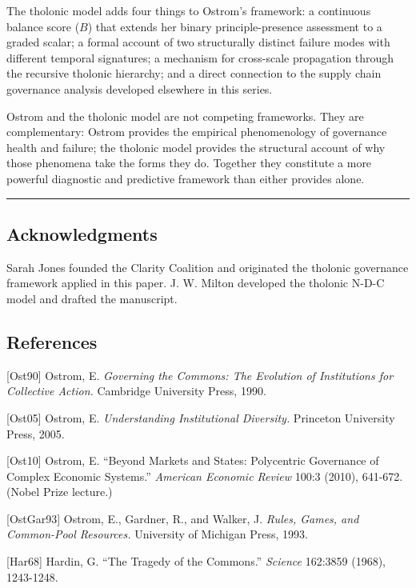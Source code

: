 \documentclass[
  11pt,
  letterpaper,
]{article}
\begin{document}
The tholonic model adds four things to Ostrom's framework: a continuous
balance score (\(B\)) that extends her binary principle-presence
assessment to a graded scalar; a formal account of two structurally
distinct failure modes with different temporal signatures; a mechanism
for cross-scale propagation through the recursive tholonic hierarchy;
and a direct connection to the supply chain governance analysis
developed elsewhere in this series.

Ostrom and the tholonic model are not competing frameworks. They are
complementary: Ostrom provides the empirical phenomenology of governance
health and failure; the tholonic model provides the structural account
of why those phenomena take the forms they do. Together they constitute
a more powerful diagnostic and predictive framework than either provides
alone.

\begin{center}\rule{0.5\linewidth}{0.5pt}\end{center}

\subsection{Acknowledgments}\label{acknowledgments}

Sarah Jones founded the Clarity Coalition and originated the tholonic
governance framework applied in this paper. J. W. Milton developed the
tholonic N-D-C model and drafted the manuscript.

\subsection{References}\label{references}

{[}Ost90{]} Ostrom, E. \emph{Governing the Commons: The Evolution of
Institutions for Collective Action.} Cambridge University Press, 1990.

{[}Ost05{]} Ostrom, E. \emph{Understanding Institutional Diversity.}
Princeton University Press, 2005.

{[}Ost10{]} Ostrom, E. ``Beyond Markets and States: Polycentric
Governance of Complex Economic Systems.'' \emph{American Economic
Review} 100:3 (2010), 641-672. (Nobel Prize lecture.)

{[}OstGar93{]} Ostrom, E., Gardner, R., and Walker, J. \emph{Rules,
Games, and Common-Pool Resources.} University of Michigan Press, 1993.

{[}Har68{]} Hardin, G. ``The Tragedy of the Commons.'' \emph{Science}
162:3859 (1968), 1243-1248.
\end{document}
